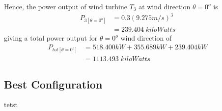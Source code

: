 Hence, the power output of wind turbine $T_3$ at wind direction $\theta=0^o$ is
    \begin{align*}
        P_{3[\theta=0^o]} &= 0.3(9.275m/s)^3 \\
        &= 239.404\;kiloWatts
    \end{align*}
giving a total power output for $\theta=0^o$ wind direction of
	\begin{align*}
		P_{tot[\theta=0^o]} &= 518.400kW + 355.689kW + 239.404kW \\
		&=1113.493\;kiloWatts
	\end{align*}
	
	\subsection{Best Configuration}
	tetst